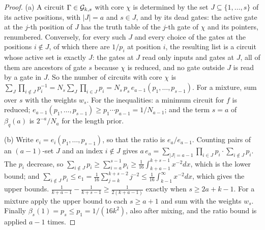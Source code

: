 \begin{proof}
(a) A circuit $\Gamma\in\mathcal G_{k,s}$ with core $\chi$ is determined by the set $J\subseteq\{1,\dots,s\}$ of its
active positions, with $|J|=a$ and $s\in J$, and by its dead gates: the active gate at the $j$-th position of
$J$ has the truth table of the $j$-th gate of $\chi$ and its pointers, renumbered. Conversely, for every such
$J$ and every choice of the gates at the positions $i\notin J$, of which there are $1/p_i$ at position $i$,
the resulting list is a circuit whose active set is exactly $J$: the gates at $J$ read only inputs and gates
at $J$, all of them are ancestors of gate $s$ because $\chi$ is reduced, and no gate outside $J$ is read by a
gate in $J$. So the number of circuits with core $\chi$ is $\sum_J\prod_{i\notin
J}p_i^{-1}=N_s\sum_J\prod_{i\in J}p_i=N_s\,p_s\,e_{a-1}(p_1,\dots,p_{s-1})$. For a mixture, sum over $s$ with
the weights $w_s$. For the inequalities: a minimum circuit for $f$ is reduced;
$e_{a-1}(p_1,\dots,p_{s-1})\ge p_1\cdots p_{a-1}=1/N_{a-1}$; and the term $s=a$ of $\beta_q(a)$ is
$2^{-a}/N_a$ for the length prior.

(b) Write $e_i=e_i(p_1,\dots,p_{s-1})$, so that the ratio is $e_a/e_{a-1}$. Counting pairs of an $(a-1)$-set
$J$ and an index $i\notin J$ gives $a\,e_a=\sum_{|J|=a-1}\prod_{i\in J}p_i\cdot\sum_{i\notin J}p_i$. The $p_i$
decrease, so $\sum_{i\notin J}p_i\ge\sum_{i=a}^{s-1}p_i\ge\frac1{16}\int_{k+a-1}^{k+s-1}x^{-2}dx$, which is
the lower bound; and $\sum_{i\notin J}p_i\le
e_1=\frac1{16}\sum_{j=k}^{k+s-2}j^{-2}\le\frac1{16}\int_{k-1}^\infty x^{-2}dx$, which gives the upper bounds.
$\frac1{k+a-1}-\frac1{k+s-1}\ge\frac1{2(k+a-1)}$ exactly when $s\ge2a+k-1$. For a mixture apply the upper
bound to each $s\ge a+1$ and sum with the weights $w_s$. Finally $\beta_s(1)=p_s\le p_1=1/(16k^2)$, also after
mixing, and the ratio bound is applied $a-1$ times.
\end{proof}

